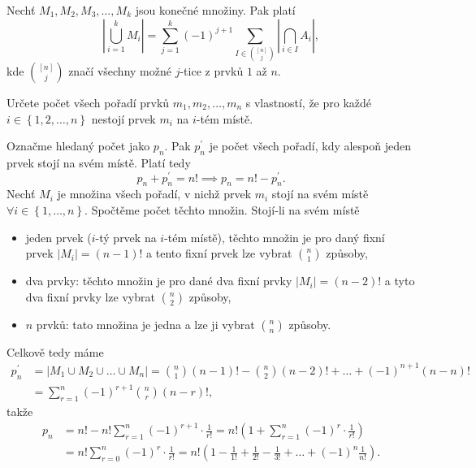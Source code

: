 \begin{veta}
    Nechť $M_1, M_2, M_3, \dots, M_k$ jsou konečné množiny. Pak platí
    $$
        \left | \bigcup\limits_{i=1}^k M_i \right | = \sum_{j=1}^k (-1)^{j+1} \sum_{I \in \binom{[n]}{j}} \left |\bigcap_{i \in I} A_i \right|,
    $$
    kde $\binom{[n]}{j}$ značí všechny možné $j$-tice z prvků $1$ až $n$.
\end{veta}

\begin{priklad}
Určete počet všech pořadí prvků $m_1,m_2,\dots,m_n$ s vlastností, že
pro každé $i\in \left \{ 1,2,\dots,n \right \} $ nestojí prvek $m_i$ na $i$-tém
místě.
\end{priklad}

\begin{reseni}
Označme hledaný počet jako $p_n$. Pak $p_n^\prime$ je počet všech pořadí,
kdy alespoň jeden prvek stojí na svém místě. Platí tedy
$$p_n+p_n^\prime = n! \implies p_n=n!-p_n^\prime.$$
Nechť $M_i$ je množina všech pořadí, v nichž prvek $m_i$ stojí na svém místě
$\forall i\in \left \{ 1,\dots,n \right \} $. Spočtěme počet těchto množin. Stojí-li
na svém místě
\begin{itemize}
\item jeden prvek ($i$-tý prvek na $i$-tém místě), těchto množin
je pro daný fixní prvek $|M_i|=(n-1)!$ a tento fixní prvek lze
vybrat $\binom{n}{1}$ způsoby,
\item dva prvky: těchto množin je pro dané dva fixní prvky $|M_i|=(n-2)!$ a tyto
dva fixní prvky lze vybrat $\binom{n}{2}$ způsoby,
\item $n$ prvků: tato množina je jedna a lze ji vybrat $\binom{n}{n}$ způsoby.
\end{itemize}
Celkově tedy máme
\begin{align*}
p_n^\prime & = |M_1\cup M_2\cup \dots \cup M_n|=\binom{n}{1}(n-1)!-\binom{n}{2}(n-2)!+\dots+(-1)^{n+1}(n-n)!\\
 &= \sum_{r=1}^n (-1)^{r+1}\binom{n}{r}(n-r)!,
\end{align*}
takže
\begin{align*}
    p_n &= n!-n! \sum_{r=1}^n(-1)^{r+1}\cdot \frac{1}{r!}=n!\left ( 1+\sum_{r=1} ^n (-1)^r\cdot \frac{1}{r!}\right )\\
   &= n!\sum_{r=0}^n (-1)^r \cdot \frac{1}{r!}=n!\left ( 1-\frac{1}{1!}+\frac{1}{2!}-\frac{1}{3!}+\dots + (-1)^n \frac{1}{n!}\right ).
\end{align*}

\end{reseni}


